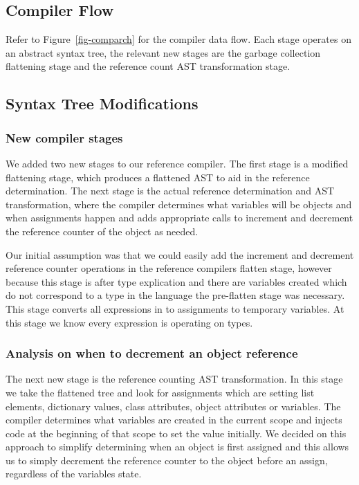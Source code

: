 \documentclass{sigplanconf}
\begin{document}
\subsection{Compiler Flow}
Refer to Figure~\ref{fig-comparch} for the compiler data flow.  Each stage operates on an abstract syntax tree, the relevant new stages are the garbage collection flattening stage and the reference count AST transformation stage.

\subsection{Syntax Tree Modifications}
\subsubsection{New compiler stages}
We added two new stages to our reference compiler.  The first stage is a modified flattening stage, which produces a flattened AST to aid in the reference determination.  The next stage is the actual reference determination and AST transformation, where the compiler determines what variables will be objects and when assignments happen and adds appropriate calls to increment and decrement the reference counter of the object as needed.
\par
Our initial assumption was that we could easily add the increment and decrement reference counter operations in the reference compilers flatten stage, however because this stage is after type explication and there are variables created which do not correspond to a type in the language the pre-flatten stage was necessary.  This stage converts all expressions in to assignments to temporary variables.  At this stage we know every expression is operating on types.
\subsubsection{Analysis on when to decrement an object reference}
The next new stage is the reference counting AST transformation.  In this stage we take the flattened tree and look for assignments which are setting list elements, dictionary values, class attributes, object attributes or variables.  The compiler determines what variables are created in the current scope and injects code at the beginning of that scope to set the value initially.  We decided on this approach to simplify determining when an object is first assigned and this allows us to simply decrement the reference counter to the object before an assign, regardless of the variables state.
\end{document}
